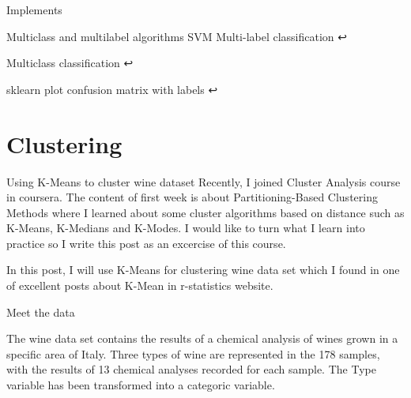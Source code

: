 Implements

Multiclass and multilabel algorithms
SVM
Multi-label classification ↩

Multiclass classification ↩

sklearn plot confusion matrix with labels ↩

\section{Clustering}
Using K-Means to cluster wine dataset
Recently, I joined Cluster Analysis course in coursera. The content of first week is about Partitioning-Based Clustering Methods where I learned about some cluster algorithms based on distance such as K-Means, K-Medians and K-Modes. I would like to turn what I learn into practice so I write this post as an excercise of this course.

In this post, I will use K-Means for clustering wine data set which I found in one of excellent posts about K-Mean in r-statistics website.

Meet the data


The wine data set contains the results of a chemical analysis of wines grown in a specific area of Italy. Three types of wine are represented in the 178 samples, with the results of 13 chemical analyses recorded for each sample. The Type variable has been transformed into a categoric variable.


